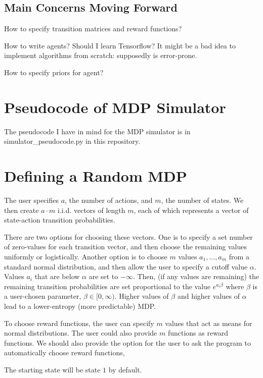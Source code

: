 \documentclass{article}
\begin{document}
\subsection{Main Concerns Moving Forward}
How to specify transition matrices and reward functions?

How to write agents? Should I learn Tensorflow? It might be a bad idea to implement algorithms from scratch: supposedly is error-prone.

How to specify priors for agent?

\section{Pseudocode of MDP Simulator}

The pseudocode I have in mind for the MDP simulator is in simulator\_pseudocode.py in this repository.

\section{Defining a Random MDP}
The user specifies $a$, the number of actions, and $m$, the number of states. We then create $a\cdot m$ i.i.d. vectors of length $m$, each of which represents a vector of state-action transition probabilities.

There are two options for choosing these vectors. One is to specify a set number of zero-values for each transition vector, and then choose the remaining values uniformly or logistically. Another option is to choose $m$ values $a_1, \ldots, a_m$ from a standard normal distribution, and then allow the user to specify a cutoff value $\alpha$. Values $a_i$ that are below $\alpha$ are set to $-\infty$. Then, (if any values are remaining) the remaining transition probabilities are set proportional to the value $e^{a_i \beta}$ where $\beta$ is a user-chosen parameter, $\beta\in[0,\infty)$. Higher values of $\beta$ and higher values of $\alpha$ lead to a lower-entropy (more predictable) MDP.

To choose reward functions, the user can specify $m$ values that act as means for normal distributions. The user could also provide $m$ functions as reward functions. We should also provide the option for the user to ask the program to automatically choose reward functions, 

The starting state will be state $1$ by default.
\end{document}
